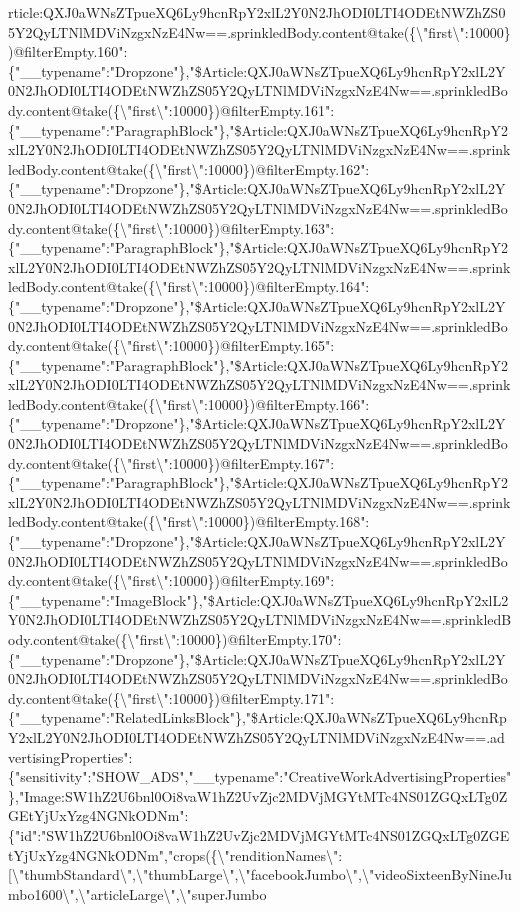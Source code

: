 rticle:QXJ0aWNsZTpueXQ6Ly9hcnRpY2xlL2Y0N2JhODI0LTI4ODEtNWZhZS05Y2QyLTNlMDViNzgxNzE4Nw==.sprinkledBody.content@take(\{\textbackslash{}"first\textbackslash{}":10000\})@filterEmpty.160":\{"\_\_typename":"Dropzone"\},"\$Article:QXJ0aWNsZTpueXQ6Ly9hcnRpY2xlL2Y0N2JhODI0LTI4ODEtNWZhZS05Y2QyLTNlMDViNzgxNzE4Nw==.sprinkledBody.content@take(\{\textbackslash{}"first\textbackslash{}":10000\})@filterEmpty.161":\{"\_\_typename":"ParagraphBlock"\},"\$Article:QXJ0aWNsZTpueXQ6Ly9hcnRpY2xlL2Y0N2JhODI0LTI4ODEtNWZhZS05Y2QyLTNlMDViNzgxNzE4Nw==.sprinkledBody.content@take(\{\textbackslash{}"first\textbackslash{}":10000\})@filterEmpty.162":\{"\_\_typename":"Dropzone"\},"\$Article:QXJ0aWNsZTpueXQ6Ly9hcnRpY2xlL2Y0N2JhODI0LTI4ODEtNWZhZS05Y2QyLTNlMDViNzgxNzE4Nw==.sprinkledBody.content@take(\{\textbackslash{}"first\textbackslash{}":10000\})@filterEmpty.163":\{"\_\_typename":"ParagraphBlock"\},"\$Article:QXJ0aWNsZTpueXQ6Ly9hcnRpY2xlL2Y0N2JhODI0LTI4ODEtNWZhZS05Y2QyLTNlMDViNzgxNzE4Nw==.sprinkledBody.content@take(\{\textbackslash{}"first\textbackslash{}":10000\})@filterEmpty.164":\{"\_\_typename":"Dropzone"\},"\$Article:QXJ0aWNsZTpueXQ6Ly9hcnRpY2xlL2Y0N2JhODI0LTI4ODEtNWZhZS05Y2QyLTNlMDViNzgxNzE4Nw==.sprinkledBody.content@take(\{\textbackslash{}"first\textbackslash{}":10000\})@filterEmpty.165":\{"\_\_typename":"ParagraphBlock"\},"\$Article:QXJ0aWNsZTpueXQ6Ly9hcnRpY2xlL2Y0N2JhODI0LTI4ODEtNWZhZS05Y2QyLTNlMDViNzgxNzE4Nw==.sprinkledBody.content@take(\{\textbackslash{}"first\textbackslash{}":10000\})@filterEmpty.166":\{"\_\_typename":"Dropzone"\},"\$Article:QXJ0aWNsZTpueXQ6Ly9hcnRpY2xlL2Y0N2JhODI0LTI4ODEtNWZhZS05Y2QyLTNlMDViNzgxNzE4Nw==.sprinkledBody.content@take(\{\textbackslash{}"first\textbackslash{}":10000\})@filterEmpty.167":\{"\_\_typename":"ParagraphBlock"\},"\$Article:QXJ0aWNsZTpueXQ6Ly9hcnRpY2xlL2Y0N2JhODI0LTI4ODEtNWZhZS05Y2QyLTNlMDViNzgxNzE4Nw==.sprinkledBody.content@take(\{\textbackslash{}"first\textbackslash{}":10000\})@filterEmpty.168":\{"\_\_typename":"Dropzone"\},"\$Article:QXJ0aWNsZTpueXQ6Ly9hcnRpY2xlL2Y0N2JhODI0LTI4ODEtNWZhZS05Y2QyLTNlMDViNzgxNzE4Nw==.sprinkledBody.content@take(\{\textbackslash{}"first\textbackslash{}":10000\})@filterEmpty.169":\{"\_\_typename":"ImageBlock"\},"\$Article:QXJ0aWNsZTpueXQ6Ly9hcnRpY2xlL2Y0N2JhODI0LTI4ODEtNWZhZS05Y2QyLTNlMDViNzgxNzE4Nw==.sprinkledBody.content@take(\{\textbackslash{}"first\textbackslash{}":10000\})@filterEmpty.170":\{"\_\_typename":"Dropzone"\},"\$Article:QXJ0aWNsZTpueXQ6Ly9hcnRpY2xlL2Y0N2JhODI0LTI4ODEtNWZhZS05Y2QyLTNlMDViNzgxNzE4Nw==.sprinkledBody.content@take(\{\textbackslash{}"first\textbackslash{}":10000\})@filterEmpty.171":\{"\_\_typename":"RelatedLinksBlock"\},"\$Article:QXJ0aWNsZTpueXQ6Ly9hcnRpY2xlL2Y0N2JhODI0LTI4ODEtNWZhZS05Y2QyLTNlMDViNzgxNzE4Nw==.advertisingProperties":\{"sensitivity":"SHOW\_ADS","\_\_typename":"CreativeWorkAdvertisingProperties"\},"Image:SW1hZ2U6bnl0Oi8vaW1hZ2UvZjc2MDVjMGYtMTc4NS01ZGQxLTg0ZGEtYjUxYzg4NGNkODNm":\{"id":"SW1hZ2U6bnl0Oi8vaW1hZ2UvZjc2MDVjMGYtMTc4NS01ZGQxLTg0ZGEtYjUxYzg4NGNkODNm","crops(\{\textbackslash{}"renditionNames\textbackslash{}":{[}\textbackslash{}"thumbStandard\textbackslash{}",\textbackslash{}"thumbLarge\textbackslash{}",\textbackslash{}"facebookJumbo\textbackslash{}",\textbackslash{}"videoSixteenByNineJumbo1600\textbackslash{}",\textbackslash{}"articleLarge\textbackslash{}",\textbackslash{}"superJumbo\tex